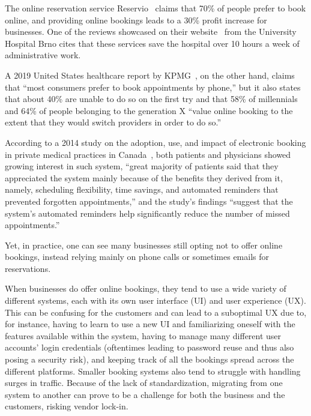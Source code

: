 The online reservation service Reservio~\cite{reservio} claims that 70\% of people prefer to book online, and providing online bookings leads to a 30\% profit increase for businesses. One of the reviews showcased on their website~\cite{reservio} from the University Hospital Brno cites that these services save the hospital over 10 hours a week of administrative work.

A 2019 United States healthcare report by KPMG~\cite{kpmg_healthcare_2030}, on the other hand, claims that \enquote{most consumers prefer to book appointments by phone,} but it also states that about 40\% are unable to do so on the first try and that 58\% of millennials and 64\% of people belonging to the generation X \enquote{value online booking to the extent that they would switch providers in order to do so.}

According to a 2014 study on the adoption, use, and impact of electronic booking in private medical practices in Canada~\cite{pare_medical_ebooking}, both patients and physicians showed growing interest in such system, \enquote{great majority of patients said that they appreciated the system mainly because of the benefits they derived from it, namely, scheduling flexibility, time savings, and automated reminders that prevented forgotten appointments,} and the study's findings \enquote{suggest that the system's automated reminders help significantly reduce the number of missed appointments.}

Yet, in practice, one can see many businesses still opting not to offer online bookings, instead relying mainly on phone calls or sometimes emails for reservations.

When businesses do offer online bookings, they tend to use a wide variety of different systems, each with its own user interface (UI) and user experience (UX). This can be confusing for the customers and can lead to a suboptimal UX due to, for instance, having to learn to use a new UI and familiarizing oneself with the features available within the system, having to manage many different user accounts' login credentials (oftentimes leading to password reuse and thus also posing a security risk), and keeping track of all the bookings spread across the different platforms. Smaller booking systems also tend to struggle with handling surges in traffic. Because of the lack of standardization, migrating from one system to another can prove to be a challenge for both the business and the customers, risking vendor lock-in.

